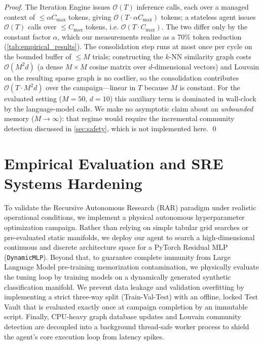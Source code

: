 \documentclass[conference]{IEEEtran}
\newcommand{\Cmax}{C_{\max}}
\begin{document}
\begin{proof}
  The Iteration Engine issues $\mathcal{O}(T)$ inference calls, each over a managed context of $\leq \alpha\Cmax$ tokens, giving $\mathcal{O}(T{\cdot}\alpha\Cmax)$ tokens; a stateless agent issues $\mathcal{O}(T)$ calls over $\leq \Cmax$ tokens, i.e. $\mathcal{O}(T{\cdot}\Cmax)$. The two differ only by the constant factor $\alpha$, which our measurements realize as a $70\%$ token reduction (\cref{tab:empirical_results}). The consolidation step runs at most once per cycle on the bounded buffer of $\leq M$ trials; constructing the $k$-NN similarity graph costs $\mathcal{O}(M^2 d)$ (a dense $M\times M$ cosine matrix over $d$-dimensional vectors) and Louvain on the resulting sparse graph is no costlier, so the consolidation contributes $\mathcal{O}(T{\cdot}M^2 d)$ over the campaign---linear in $T$ because $M$ is constant. For the evaluated setting ($M{=}50$, $d{=}10$) this auxiliary term is dominated in wall-clock by the language-model calls. We make no asymptotic claim about an \emph{unbounded} memory ($M\!\to\!\infty$): that regime would require the incremental community detection discussed in \cref{sec:safety}, which is not implemented here. \qed
\end{proof}
\section{Empirical Evaluation and SRE Systems Hardening}
\label{sec:experiments}

To validate the Recursive Autonomous Research (RAR) paradigm under realistic operational conditions, we implement a physical autonomous hyperparameter optimization campaign. Rather than relying on simple tabular grid searches or pre-evaluated static manifolds, we deploy our agent to search a high-dimensional continuous and discrete architecture space for a PyTorch Residual MLP (\texttt{DynamicMLP}). Beyond that, to guarantee complete immunity from Large Language Model pre-training memorization contamination, we physically evaluate the tuning loop by training models on a dynamically generated synthetic classification manifold. We prevent data leakage and validation overfitting by implementing a strict three-way split (Train-Val-Test) with an offline, locked Test Vault that is evaluated exactly once at campaign completion by an immutable script. Finally, CPU-heavy graph database updates and Louvain community detection are decoupled into a background thread-safe worker process to shield the agent's core execution loop from latency spikes.
\end{document}
